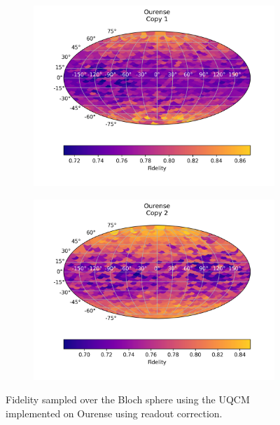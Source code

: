 \begin{figure}[H]
    \centering
    \begin{subfigure}{.5\textwidth}
      \centering
      \includegraphics[width=\textwidth]{Figures/UQCM/IBM/FullSphere/results_corrected_ourense_copy1.png}
    \end{subfigure}%
    \begin{subfigure}{.5\textwidth}
      \centering
      \includegraphics[width=\textwidth]{Figures/UQCM/IBM/FullSphere/results_corrected_ourense_copy2.png}
    \end{subfigure}
    \caption{Fidelity sampled over the Bloch sphere using the UQCM implemented on Ourense using readout correction.}
    \label{fig:uqcm_our}
\end{figure}



